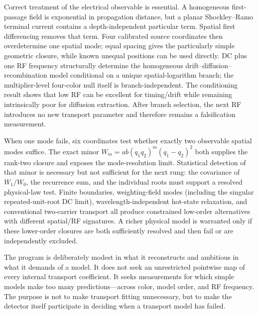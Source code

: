 \documentclass[11pt]{article}
\begin{document}
Correct treatment of the electrical observable is essential. A homogeneous first-passage field is exponential in propagation distance, but a planar Shockley--Ramo terminal current contains a depth-independent particular term. Spatial first differencing removes that term. Four calibrated source coordinates then overdetermine one spatial mode; equal spacing gives the particularly simple geometric closure, while known unequal positions can be used directly. DC plus one RF frequency structurally determine the homogeneous drift--diffusion--recombination model conditional on a unique spatial-logarithm branch; the multiplier-level four-color null itself is branch-independent. The conditioning result shows that low RF can be excellent for timing/drift while remaining intrinsically poor for diffusion extraction. After branch selection, the next RF introduces no new transport parameter and therefore remains a falsification measurement.

When one mode fails, six coordinates test whether exactly two observable spatial modes suffice. The exact minor $W_m=ab(q_1q_2)^m(q_1-q_2)^2$ both supplies the rank-two closure and exposes the mode-resolution limit. Statistical detection of that minor is necessary but not sufficient for the next rung: the covariance of $W_1/W_0$, the recurrence sum, and the individual roots must support a resolved physical-law test. Finite boundaries, weighting-field modes (including the singular repeated-unit-root DC limit), wavelength-independent hot-state relaxation, and conventional two-carrier transport all produce constrained low-order alternatives with different spatial/RF signatures. A richer physical model is warranted only if these lower-order closures are both sufficiently resolved and then fail or are independently excluded.

The program is deliberately modest in what it reconstructs and ambitious in what it demands of a model. It does not seek an unrestricted pointwise map of every internal transport coefficient. It seeks measurements for which simple models make too many predictions---across color, model order, and RF frequency. The purpose is not to make transport fitting unnecessary, but to make the detector itself participate in deciding when a transport model has failed.
\end{document}
